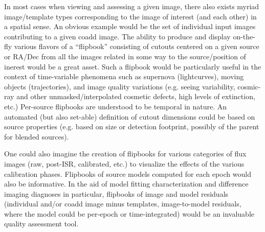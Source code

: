 In most cases when viewing and assessing a given image, there also exists myriad image/template types corresponding to the image of interest (and each other) in a spatial sense.  An obvious example would be the set of individual input images contributing to a given coadd image.  The ability to produce and display on-the-fly various flavors of a ``flipbook'' consisting of cutouts centered on a given source or RA/Dec from all the images related in some way to the source/position of inerest would be a great asset.  Such a flipbook would be particularly useful in the context of time-variable phenomena such as supernova (lightcurves), moving objects (trajectories), and image quality variations (e.g. seeing variability, cosmic-ray and other unmasked/interpolated cosmetic defects, high levels of extinction, etc.)  Per-source flipbooks are understood to be temporal in nature.  An automated (but also set-able) definition of cutout dimensions could be based on source properties (e.g. based on size or detection footprint, possibly of the parent for blended sources).

One could also imagine the creation of flipbooks for various categories of flux images (raw, post-ISR, calibrated, etc.) to visualize the effects of the various calibration phases.  Flipbooks of source models computed for each epoch would also be informative.  In the aid of model fitting characterization and difference imaging diagnoses in particular, flipbooks of image and model residuals (individual and/or coadd image minus templates, image-to-model residuals, where the model could be per-epoch or time-integrated) would be an invaluable quality assessment tool.
